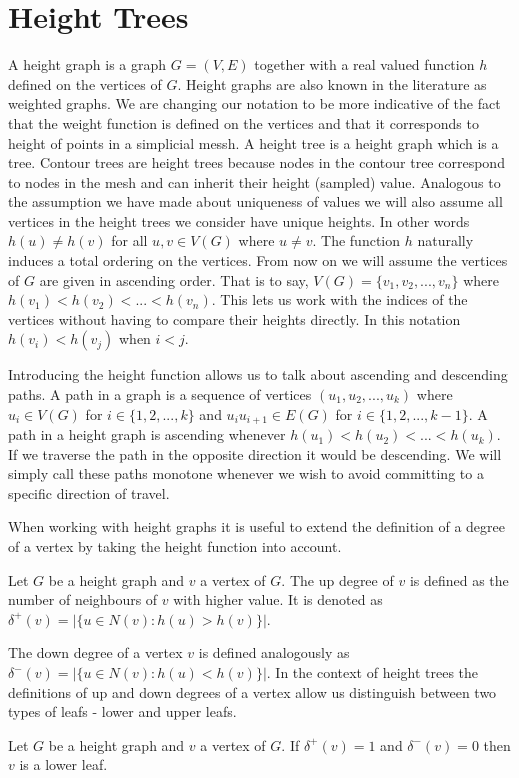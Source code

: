 \section{Height Trees}

A height graph is a graph $G = (V, E)$ together with a real valued function $h$ defined on the vertices of $G$. Height graphs are also known in the literature as weighted graphs. We are changing our notation to be more indicative of the fact that the weight function is defined on the vertices and that it corresponds to height of points in a simplicial messh. A height tree is a height graph which is a tree. Contour trees are height trees because nodes in the contour tree correspond to nodes in the mesh and can inherit their height (sampled) value. Analogous to the assumption we have made about uniqueness of values we will also assume all vertices in the height trees we consider have unique heights. In other words $h(u) \ne h(v)$ for all $u ,v \in V(G)$ where $u \ne v$. The function $h$ naturally induces a total ordering on the vertices. From now on we will assume the vertices of $G$ are given in ascending order. That is to say, $V(G) = \{v_1, v_2, ... , v_n\}$ where $h(v_1) < h(v_2) < ... < h(v_n)$. This lets us work with the indices of the vertices without having to compare their heights directly. In this notation $h(v_i) < h(v_j)$ when $i < j$.

Introducing the height function allows us to talk about ascending and descending paths. A path in a graph is a sequence of vertices $(u_1, u_2, ... , u_k)$ where $u_i \in V(G)$ for $i \in \{1, 2, ..., k\}$ and $u_iu_{i+1} \in E(G)$ for $i \in \{1, 2, ..., k-1\}$. A path in a height graph is ascending whenever $h(u_1) < h(u_2) < ... < h(u_k)$. If we traverse the path in the opposite direction it would be descending. We will simply call these paths monotone whenever we wish to avoid committing to a specific direction of travel.

When working with height graphs it is useful to extend the definition of a degree of a vertex by taking the height function into account.

\begin{defn} Let $G$ be a height graph and $v$ a vertex of $G$. The up degree of $v$ is defined as the number of neighbours of $v$ with higher value. It is denoted as $\delta^+(v) = \big|\{ u \in N(v) : h(u) > h(v) \}\big|$.   \end{defn}

The down degree of a vertex $v$ is defined analogously as $\delta^-(v) = \big|\{ u \in N(v) : h(u) < h(v) \}\big|$. In the context of height trees the definitions of up and down degrees of a vertex allow us distinguish between two types of leafs - lower and upper leafs.
\begin{defn} Let $G$ be a height graph and $v$ a vertex of $G$. If  $\delta^+(v) = 1$ and $\delta^-(v) = 0$ then $v$ is a lower leaf.  \end{defn}

